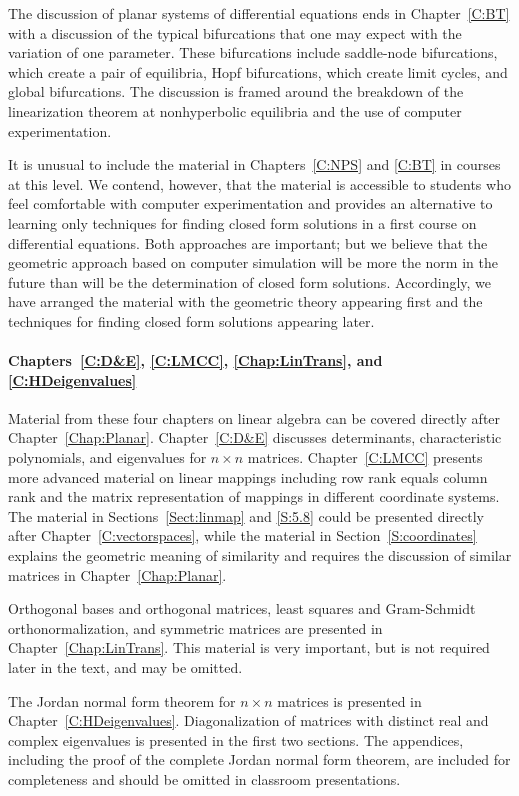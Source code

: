 \documentclass{ximera}
\begin{document}
The discussion of planar systems of differential equations ends in
Chapter~\ref{C:BT} with a discussion of the typical bifurcations that one 
may expect with the variation of one parameter.  These bifurcations include
saddle-node bifurcations, which create a pair of equilibria, Hopf
bifurcations, which create limit cycles, and global bifurcations.  The
discussion is framed around the breakdown of the linearization theorem at
nonhyperbolic equilibria and the use of computer experimentation.  

It is unusual to include the material in Chapters~\ref{C:NPS} and \ref{C:BT}
in courses at this level.  We contend, however, that the material is
accessible to students who feel comfortable with computer experimentation and
provides an alternative to learning only techniques for finding closed form 
solutions in a first course on differential equations.  Both approaches
are important; but we believe that the geometric approach based on computer
simulation will be more the norm in the future than will be the determination
of closed form solutions.  Accordingly, we have arranged the material with
the geometric theory appearing first and the techniques for finding closed
form solutions appearing later.

\paragraph{Chapters~\ref{C:D&E}, \ref{C:LMCC}, \ref{Chap:LinTrans}, and 
\ref{C:HDeigenvalues}}  Material from these four chapters on linear algebra
can be covered directly after Chapter~\ref{Chap:Planar}. Chapter~\ref{C:D&E} 
discusses determinants, characteristic polynomials, and eigenvalues for
$n\times n$ matrices.  Chapter~\ref{C:LMCC} presents more advanced
material on linear mappings including row rank equals column rank and the
matrix representation of mappings in different coordinate systems.  The 
material in Sections~\ref{Sect:linmap} and \ref{S:5.8} could be presented 
directly after Chapter~\ref{C:vectorspaces}, while the material in
Section~\ref{S:coordinates} explains the geometric meaning of similarity and 
requires the discussion of similar matrices in Chapter~\ref{Chap:Planar}.  

Orthogonal bases and orthogonal matrices, least squares and Gram-Schmidt
orthonormalization, and symmetric matrices are presented in 
Chapter~\ref{Chap:LinTrans}.  This material is very important, but is not 
required later in the text, and may be omitted.

The Jordan normal form theorem for $n\times n$ matrices is presented in 
Chapter~\ref{C:HDeigenvalues}.  Diagonalization of matrices with distinct
real and complex eigenvalues is presented in the first two sections.  The
appendices, including the proof of the complete Jordan normal form theorem,
are included for completeness and should be omitted in classroom
presentations.
\end{document}
